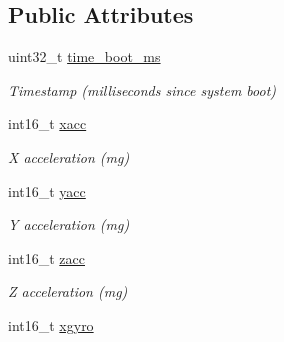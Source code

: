 \subsection*{Public Attributes}
\begin{DoxyCompactItemize}
\item 
\hypertarget{struct____mavlink__scaled__imu__t_a3bdcf7dc969ea7ca67657b1420652468}{uint32\+\_\+t \hyperlink{struct____mavlink__scaled__imu__t_a3bdcf7dc969ea7ca67657b1420652468}{time\+\_\+boot\+\_\+ms}}\label{struct____mavlink__scaled__imu__t_a3bdcf7dc969ea7ca67657b1420652468}

\begin{DoxyCompactList}\small\item\em Timestamp (milliseconds since system boot) \end{DoxyCompactList}\item 
\hypertarget{struct____mavlink__scaled__imu__t_a2fe0911cd27268449b437b15d5bc8ab7}{int16\+\_\+t \hyperlink{struct____mavlink__scaled__imu__t_a2fe0911cd27268449b437b15d5bc8ab7}{xacc}}\label{struct____mavlink__scaled__imu__t_a2fe0911cd27268449b437b15d5bc8ab7}

\begin{DoxyCompactList}\small\item\em X acceleration (mg) \end{DoxyCompactList}\item 
\hypertarget{struct____mavlink__scaled__imu__t_aa3c8baf85a0087a26c7be8d2203744f8}{int16\+\_\+t \hyperlink{struct____mavlink__scaled__imu__t_aa3c8baf85a0087a26c7be8d2203744f8}{yacc}}\label{struct____mavlink__scaled__imu__t_aa3c8baf85a0087a26c7be8d2203744f8}

\begin{DoxyCompactList}\small\item\em Y acceleration (mg) \end{DoxyCompactList}\item 
\hypertarget{struct____mavlink__scaled__imu__t_aa7263339399089b12c2874278033a5a1}{int16\+\_\+t \hyperlink{struct____mavlink__scaled__imu__t_aa7263339399089b12c2874278033a5a1}{zacc}}\label{struct____mavlink__scaled__imu__t_aa7263339399089b12c2874278033a5a1}

\begin{DoxyCompactList}\small\item\em Z acceleration (mg) \end{DoxyCompactList}\item 
\hypertarget{struct____mavlink__scaled__imu__t_aed9c79287653e608e2eef8b904189fae}{int16\+\_\+t \hyperlink{struct____mavlink__scaled__imu__t_aed9c79287653e608e2eef8b904189fae}{xgyro}}\label{struct____mavlink__scaled__imu__t_aed9c79287653e608e2eef8b904189fae}


\end{DoxyCompactItemize}
